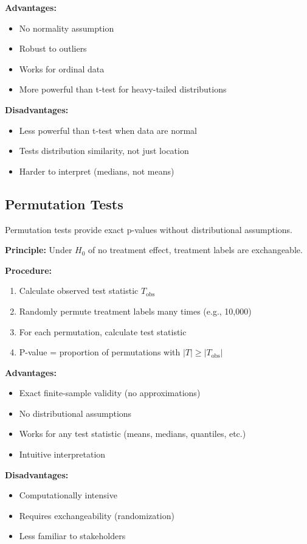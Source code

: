 \textbf{Advantages:}
\begin{itemize}
    \item No normality assumption
    \item Robust to outliers
    \item Works for ordinal data
    \item More powerful than t-test for heavy-tailed distributions
\end{itemize}

\textbf{Disadvantages:}
\begin{itemize}
    \item Less powerful than t-test when data are normal
    \item Tests distribution similarity, not just location
    \item Harder to interpret (medians, not means)
\end{itemize}

\subsection{Permutation Tests}

Permutation tests provide exact p-values without distributional assumptions.

\textbf{Principle:} Under $H_0$ of no treatment effect, treatment labels are exchangeable.

\textbf{Procedure:}
\begin{enumerate}
    \item Calculate observed test statistic $T_{\text{obs}}$
    \item Randomly permute treatment labels many times (e.g., 10,000)
    \item For each permutation, calculate test statistic
    \item P-value = proportion of permutations with $|T| \geq |T_{\text{obs}}|$
\end{enumerate}

\textbf{Advantages:}
\begin{itemize}
    \item Exact finite-sample validity (no approximations)
    \item No distributional assumptions
    \item Works for any test statistic (means, medians, quantiles, etc.)
    \item Intuitive interpretation
\end{itemize}

\textbf{Disadvantages:}
\begin{itemize}
    \item Computationally intensive
    \item Requires exchangeability (randomization)
    \item Less familiar to stakeholders
\end{itemize}

